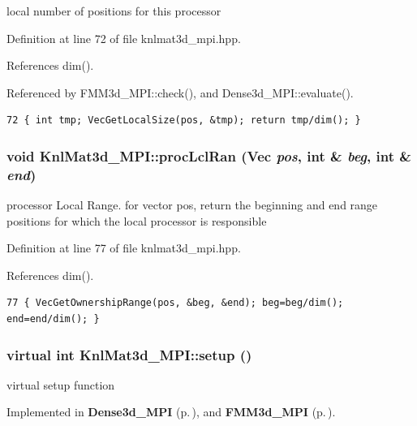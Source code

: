 local number of positions for this processor 

Definition at line 72 of file knlmat3d\_\-mpi.hpp.

References dim().

Referenced by FMM3d\_\-MPI::check(), and Dense3d\_\-MPI::evaluate().

\footnotesize\begin{verbatim}72 { int tmp; VecGetLocalSize(pos, &tmp); return tmp/dim(); }
\end{verbatim}\normalsize 


\subsubsection{\setlength{\rightskip}{0pt plus 5cm}void Knl\-Mat3d\_\-MPI::proc\-Lcl\-Ran (Vec {\em pos}, int \& {\em beg}, int \& {\em end})\hspace{0.3cm}{\tt  [inline]}}\label{classKnlMat3d__MPI_c77ddf71aecd48cd8a8ed887d5bcd834_c77ddf71aecd48cd8a8ed887d5bcd834}


processor Local Range. for vector pos, return the beginning and end range positions for which the local processor is responsible 

Definition at line 77 of file knlmat3d\_\-mpi.hpp.

References dim().

\footnotesize\begin{verbatim}77 { VecGetOwnershipRange(pos, &beg, &end); beg=beg/dim(); end=end/dim(); }
\end{verbatim}\normalsize 


\subsubsection{\setlength{\rightskip}{0pt plus 5cm}virtual int Knl\-Mat3d\_\-MPI::setup ()\hspace{0.3cm}{\tt  [pure virtual]}}\label{classKnlMat3d__MPI_98f7aa1beebfd344710d076d3d6413a2_98f7aa1beebfd344710d076d3d6413a2}


virtual setup function 

Implemented in {\bf Dense3d\_\-MPI} {\rm (p.\,\pageref{classDense3d__MPI_415266b005d267e801176f27c0434a50_415266b005d267e801176f27c0434a50})}, and {\bf FMM3d\_\-MPI} {\rm (p.\,\pageref{classFMM3d__MPI_415266b005d267e801176f27c0434a50_415266b005d267e801176f27c0434a50})}.
